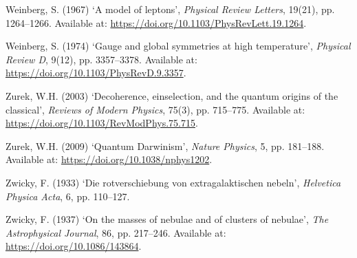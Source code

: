 \documentclass[
]{article}
\newlength{\cslhangindent}
\newenvironment{CSLReferences}[2] %
 {\begin{list}{}{%
  \setlength{\itemindent}{0pt}
  \setlength{\leftmargin}{0pt}
  \setlength{\parsep}{0pt}
  \ifodd #1
   \setlength{\leftmargin}{\cslhangindent}
   \setlength{\itemindent}{-1\cslhangindent}
  \fi
  \setlength{\itemsep}{#2\baselineskip}}}
 {\end{list}}
\begin{document}
\begin{CSLReferences}{0}{1}
Weinberg, S. (1967) {`A model of leptons'}, \emph{Physical Review
Letters}, 19(21), pp. 1264--1266. Available at:
\url{https://doi.org/10.1103/PhysRevLett.19.1264}.

Weinberg, S. (1974) {`Gauge and global symmetries at high temperature'},
\emph{Physical Review D}, 9(12), pp. 3357--3378. Available at:
\url{https://doi.org/10.1103/PhysRevD.9.3357}.

Zurek, W.H. (2003) {`Decoherence, einselection, and the quantum origins
of the classical'}, \emph{Reviews of Modern Physics}, 75(3), pp.
715--775. Available at: \url{https://doi.org/10.1103/RevModPhys.75.715}.

Zurek, W.H. (2009) {`{Quantum Darwinism}'}, \emph{Nature Physics}, 5,
pp. 181--188. Available at: \url{https://doi.org/10.1038/nphys1202}.

Zwicky, F. (1933) {`Die rotverschiebung von extragalaktischen nebeln'},
\emph{Helvetica Physica Acta}, 6, pp. 110--127.

Zwicky, F. (1937) {`On the masses of nebulae and of clusters of
nebulae'}, \emph{The Astrophysical Journal}, 86, pp. 217--246. Available
at: \url{https://doi.org/10.1086/143864}.

\end{CSLReferences}
\end{document}
